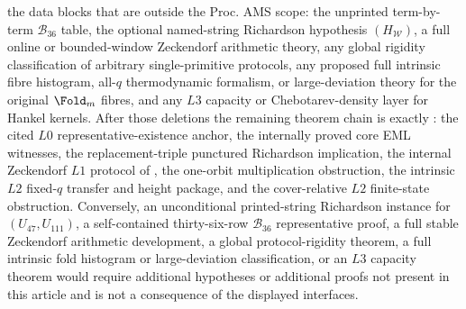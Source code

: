 \begin{proposition}
the data blocks that are outside the Proc. AMS scope: the unprinted term-by-term
\(\mathcal B_{36}\) table, the optional named-string Richardson hypothesis
\((H_{\mathcal W})\), a full online or bounded-window Zeckendorf arithmetic
theory, any global rigidity classification of arbitrary single-primitive
protocols, any proposed full intrinsic fibre histogram, all-\(q\) thermodynamic
formalism, or large-deviation theory for the original \(\Fold_m\) fibres, and any
\(L3\) capacity or Chebotarev-density layer for Hankel kernels.  After those
deletions the remaining theorem chain is exactly : the
cited \(L0\) representative-existence anchor, the internally proved core EML
witnesses, the replacement-triple punctured Richardson implication, the internal
Zeckendorf \(L1\) protocol of
, the one-orbit
multiplication obstruction, the intrinsic \(L2\) fixed-\(q\) transfer and height
package, and the cover-relative \(L2\) finite-state obstruction.  Conversely, an
unconditional printed-string
Richardson instance for \((U_{47},U_{111})\), a self-contained thirty-six-row
\(\mathcal B_{36}\) representative proof, a full stable Zeckendorf arithmetic
development, a global protocol-rigidity theorem, a full intrinsic fold histogram
or large-deviation classification, or an \(L3\) capacity theorem would require
additional hypotheses or additional proofs not present in this article and is
not a consequence of the displayed interfaces.
\end{proposition}


